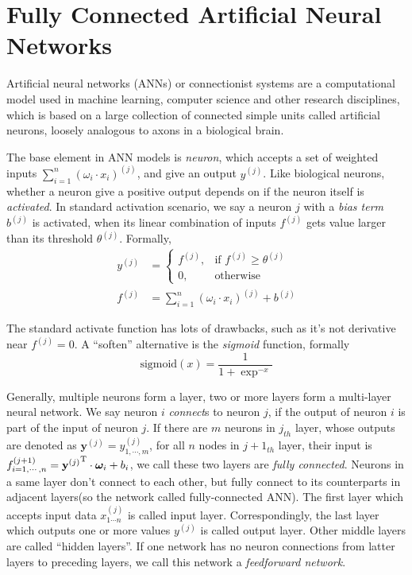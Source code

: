 \section{Fully Connected Artificial Neural Networks}
Artificial neural networks (ANNs) or connectionist systems are a computational model used in machine learning, 
computer science and other research disciplines, which is based on a large collection of connected simple units called artificial neurons, 
loosely analogous to axons in a biological brain\cite{kohonen1988introduction}.

The base element in ANN models is \textit{neuron}, which accepts a set of weighted inputs
$\sum_{i=1}^{n}(\omega_i\cdot x_i)^{(j)}$, and give an output $y^{(j)}$. 
Like biological neurons, whether a neuron give a positive output depends on if the
neuron itself is \textit{activated}. In standard activation scenario, 
we say a neuron $j$ with a \textit{bias term} $b^{(j)}$ is activated,
when its linear combination of inputs $f^{(j)}$ gets value larger than its threshold $\theta^{(j)}$.
Formally,
\begin{equation}
\begin{array}{rl}
y^{(j)}&=\left\{
        \begin{array}{rl}
        f^{(j)} ,& \textrm{if $f^{(j)} \ge \theta^{(j)}$} \\
        0 ,& \textrm{otherwise}
        \end{array}
\right. \\
f^{(j)}&=\sum_{i=1}^{n}(\omega_i\cdot x_i)^{(j)} + b^{(j)}
\end{array}
\end{equation}

The standard activate function has lots of drawbacks, such as it's not derivative
near $f^{(j)} = 0$. A ``soften'' alternative is the \textit{sigmoid} function,
formally
\begin{equation}
\textrm{sigmoid}(x)=\frac{1}{1+\exp^{-x}}
\end{equation} 

Generally, multiple neurons form a layer, two or more layers form a multi-layer
neural network. 
We say neuron $i$ \textit{connect}s to neuron $j$, if the output of neuron $i$ is
part of the input of neuron $j$.
If there are $m$ neurons in $j_{th}$ layer, whose outputs are denoted as $\mathbf{y}^{(j)} = y^{(j)}_{1,\cdots,m}$,
for all $n$ nodes in $j + 1_{th}$ layer, their input is $f^{(j+1)}_{i=1,\cdots,n}={\mathbf{y}^{(j)}}^{\rm T} \cdot \boldsymbol{\omega}_i + b_i$,
we call these two layers are \textit{fully connected}.
Neurons in a same layer don't connect to each other, but fully connect to its counterparts
in adjacent layers(so the network called fully-connected ANN). 
The first layer which accepts input data $x_{1\cdots n}^{(j)}$ is called input layer.
Correspondingly, the last layer which outputs one or more values $y^{(j)}$ is called output layer.
Other middle layers are called ``hidden layers''.
If one network has no neuron connections from latter layers to preceding layers,
we call this network a \textit{feedforward network}.

